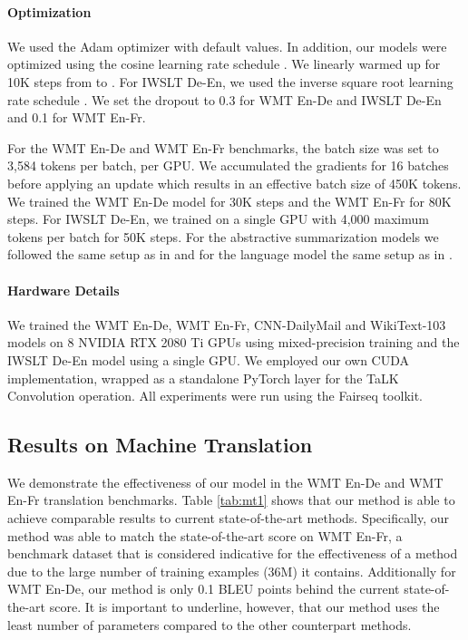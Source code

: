\documentclass{article}
\def\talkconvfull{TaLK Convolution}
\def\wiki{WikiText-103}
\def\cnndm{CNN-DailyMail}
\def\iwslt{IWSLT De-En}
\def\ende{WMT En-De}
\def\enfr{WMT En-Fr}
\begin{document}
\paragraph{Optimization} We used the Adam optimizer \cite{kingma2014adam} with default values. In addition, our models were optimized using the cosine learning rate schedule \cite{loshchilov2016sgdr}. We linearly warmed up for 10K steps from  to . For \iwslt{}, we used the inverse square root learning rate schedule \cite{vaswani2017attention}. We set the dropout to 0.3 for \ende{} and \iwslt{} and 0.1 for \enfr{}.

For the \ende{} and \enfr{} benchmarks, the batch size was set to 3,584 tokens per batch, per GPU. We accumulated the gradients for 16 batches before applying an update which results in an effective batch size of 450K tokens. We trained the \ende{} model for 30K steps and the \enfr{} for 80K steps. For \iwslt{}, we trained on a single GPU with 4,000 maximum tokens per batch  for 50K steps. For the abstractive summarization models we followed the same setup as in \citet{wu2019pay} and for the language model the same setup as in \citet{DBLP:journals/corr/abs-1809-10853}.
    
\paragraph{Hardware Details} We trained the \ende{}, \enfr{}, \cnndm{} and \wiki{} models on 8 NVIDIA RTX 2080 Ti GPUs using mixed-precision training \cite{DBLP:journals/corr/abs-1710-03740} and the \iwslt{} model using a single GPU. We employed our own CUDA implementation, wrapped as a standalone PyTorch layer for the \talkconvfull{} operation. All experiments were run using the Fairseq \cite{ott2019fairseq} toolkit.


\subsection{Results on Machine Translation}

We demonstrate the effectiveness of our model in the \ende{} and \enfr{} translation benchmarks. Table \ref{tab:mt1} shows that our method is able to achieve comparable results to current state-of-the-art methods. Specifically, our method was able to match the state-of-the-art score on \enfr{}, a benchmark dataset that is considered indicative for the effectiveness of a method due to the large number of training examples (36M) it contains. Additionally for \ende{}, our method is only 0.1 BLEU points behind the current state-of-the-art score. 
It is important to underline, however, that our method uses the least number of parameters compared to the other counterpart methods.
\end{document}
